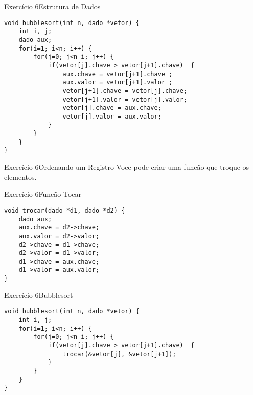 \documentclass[aspectratio=169]{beamer}
\begin{document}

\begin{frame}[fragile]{Exercício 6}{Estrutura de Dados}
\begin{lstlisting}[style=CStyle]
void bubblesort(int n, dado *vetor) {
    int i, j;
    dado aux;
    for(i=1; i<n; i++) {
        for(j=0; j<n-i; j++) {
            if(vetor[j].chave > vetor[j+1].chave)  {
                aux.chave = vetor[j+1].chave ;
                aux.valor = vetor[j+1].valor ;
                vetor[j+1].chave = vetor[j].chave;
                vetor[j+1].valor = vetor[j].valor;                
                vetor[j].chave = aux.chave;
                vetor[j].valor = aux.valor;
            }
        }
    }
}
\end{lstlisting}
\end{frame}


\begin{frame}[fragile]{Exercício 6}{Ordenando um Registro}
Voce pode criar uma funcão que troque os elementos.
\end{frame}


\begin{frame}[fragile]{Exercício 6}{Funcão Tocar}
\begin{lstlisting}[style=CStyle]
void trocar(dado *d1, dado *d2) {
	dado aux;
	aux.chave = d2->chave;
	aux.valor = d2->valor;
	d2->chave = d1->chave;
	d2->valor = d1->valor;                
	d1->chave = aux.chave;
	d1->valor = aux.valor;
}
\end{lstlisting}
\end{frame}

\begin{frame}[fragile]{Exercício 6}{Bubblesort}
\begin{lstlisting}[style=CStyle]
void bubblesort(int n, dado *vetor) {
    int i, j;
    for(i=1; i<n; i++) {
        for(j=0; j<n-i; j++) {
            if(vetor[j].chave > vetor[j+1].chave)  {
                trocar(&vetor[j], &vetor[j+1]);
            }
        }
    }
}
\end{lstlisting}
\end{frame}
\end{document}
